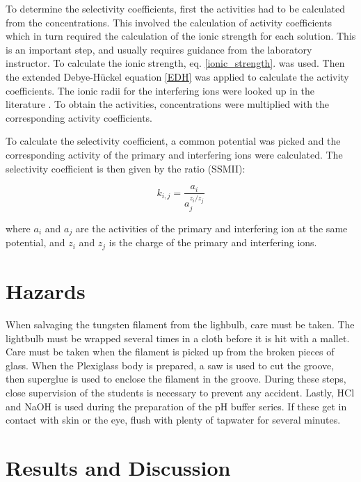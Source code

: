 \documentclass[manuscript=article, journal=jceda8]{achemso}
\begin{document}
To determine the selectivity coefficients, first the activities had to be calculated from the concentrations. This involved the calculation of activity coefficients which in turn required the calculation of the ionic strength for each solution. This is an important step, and usually requires guidance from the laboratory instructor. To calculate the ionic strength, eq. \ref{ionic_strength}. was used. Then the extended Debye-Hückel equation \ref{EDH} was applied to calculate the activity coefficients. The ionic radii for the interfering ions were looked up in the literature \cite{kielland1937individual}. To obtain the activities, concentrations were multiplied with the corresponding activity coefficients.

To calculate the selectivity coefficient, a common potential was picked and the corresponding activity of the primary and interfering ions were calculated. The selectivity coefficient is then given by the ratio (SSMII):

\begin{equation}
k_{i,j} = \frac{a_i} {a_j^{z_i/z_j}}
\end{equation}

where $a_i$ and $a_j$ are the activities of the primary and interfering ion at the same potential, and $z_i$ and $z_j$ is the charge of the primary and interfering ions.

\section{Hazards}
When salvaging the tungsten filament from the lighbulb, care must be taken. The lightbulb must be wrapped several times in a cloth before it is hit with a mallet. Care must be taken when the filament is picked up from the broken pieces of glass. When the Plexiglass body is prepared, a saw is used to cut the groove, then superglue is used to enclose the filament in the groove. During these steps, close supervision of the students is necessary to prevent any accident. Lastly, HCl and NaOH is used during the preparation of the pH buffer series. If these get in contact with skin or the eye, flush with plenty of tapwater for several minutes.


\section{Results and Discussion}
\end{document}
